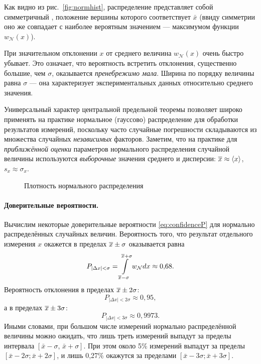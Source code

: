 Как видно из рис.~\ref{fig:normhist}, распределение представляет собой
симметричный
, положение вершины которого
соответствует $\bar{x}$ (ввиду симметрии оно же
совпадает с наиболее вероятным значением --- максимумом
функции $w_{\mathcal{N}}(x)$).

При значительном отклонении $x$ от среднего величина
$w_{\mathcal{N}}\!\left(x\right)$
очень быстро убывает. Это означает, что вероятность встретить отклонения,
существенно большие, чем $\sigma$, оказывается \emph{пренебрежимо
мала}. Ширина  по порядку величины
равна $\sigma$ --- она характеризует 
экспериментальных данных относительно среднего значения.


Универсальный характер центральной предельной теоремы позволяет широко
применять на практике нормальное (гауссово) распределение для обработки
результатов измерений, поскольку часто случайные погрешности складываются из
множества случайных \emph{независимых} факторов. Заметим, что на практике
для \emph{приближённой оценки} параметров нормального распределения
случайной величины используются \emph{выборочные} значения среднего
и дисперсии: $\overline{x}\approx\left<x\right>$, $s_{x}\approx\sigma_{x}$.

\begin{figure}[ht]
    \centering
    
    \caption{Плотность нормального распределения}
\end{figure}

\paragraph{Доверительные вероятности.}
Вычислим некоторые доверительные вероятности \eqref{eq:confidenceP} для нормально
распределённых случайных величин.
Вероятность того, что результат отдельного измерения $x$ окажется
в пределах $\overline{x}\pm\sigma$ оказывается равна
\[
P_{\left|\Delta x\right|<\sigma} =
\int\limits_{\overline{x}-\sigma}^{\overline{x}+\sigma}
w_{\mathcal{N}} dx \approx0{,}68.
\]
Вероятность отклонения в пределах $\overline{x}\pm2\sigma$:
\[
P_{\left|\Delta x\right|<2\sigma}\approx0{,}95,
\]
а в пределах $\overline{x}\pm3\sigma$:
\[
P_{\left|\Delta x\right|<3\sigma}\approx0{,}9973.
\]
Иными словами, при большом числе измерений нормально распределённой
величины можно ожидать, что лишь треть измерений выпадут за пределы интервала
$\left[\bar{x}-\sigma,\,\bar{x}+\sigma\right]$. При этом около 5\%
измерений выпадут за пределы $\left[\bar{x}-2\sigma;\bar{x}+2\sigma\right]$,
и лишь 0,27\% окажутся за пределами
$\left[\bar{x}-3\sigma;\bar{x}+3\sigma\right]$.

